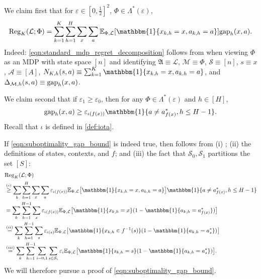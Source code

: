 \documentclass[11pt]{article}
\newcommand{\mf}[1]{\mathfrak{#1}}
\newcommand{\mcA}{\mathcal{A}}
\newcommand{\mcL}{\mathcal{L}}
\newcommand{\mcM}{\mathcal{M}}
\newcommand{\mcS}{\mathcal{S}}
\newcommand{\mbbE}{\mathbb{E}}
\newcommand{\reg}{\textnormal{Reg}}
\newcommand{\gap}{\textnormal{gap}}
\theoremstyle{definition}
\theoremstyle{definition}
\begin{document}
We claim first that
for $\varepsilon \in [0, \tfrac{1}{2}]^2$,
$\Phi \in \Lambda^*(\varepsilon)$,
\begin{equation}
	\reg_K(\mcL;\Phi)
	=
	\sum_{k = 1}^K
	\sum_{h = 1}^H
	\sum_x
	\sum_a
	\mbbE_{\Phi,\mcL}[\mathbbm{1}\{x_{k,h}=x,a_{k,h}=a\}]\gap_h(x,a)
	.
	\label{eqn:standard_mdp_regret_decomposition}
\end{equation}
Indeed: \eqref{eqn:standard_mdp_regret_decomposition} follows from \cite[Proposition 4]{tirinzoni2021fully} when viewing $\Phi$ as an \gls{MDP} with state space $[n]$ and identifying
$\mf{A} \equiv \mcL$,
$\mcM \equiv \Phi$,
$\mcS \equiv [n]$,
$s \equiv x$,
$\mcA \equiv [A]$,
$N_{K,h}(s,a) \equiv \sum_{k=1}^K\mathbbm{1}\{x_{k,h}=x,a_{k,h}=a\}$,
and
$\Delta_{\mcM,h}(s,a)\equiv \gap_h(x,a)$.

We claim second that
if $\varepsilon_1 \geq \varepsilon_0$,
then
for any $\Phi \in \Lambda^*(\varepsilon)$ and $h\in[H]$,
\begin{equation}
	\gap_h(x,a)
	\geq
	\varepsilon_{\iota(f(x))} \mathbbm{1}\{a\neq a^*_{f(x)}, h\leq H-1\}
	.
	\label{eqn:suboptimality_gap_bound}
\end{equation}
Recall that $\iota$ is defined in \eqref{def:iota}.

If \eqref{eqn:suboptimality_gap_bound} is indeed true, then  follows from
(i) ;
(ii) the definitions of states, contexts, and $f$;
and
(iii) the fact that $\mathcal{S}_0, \mathcal{S}_1$ partitions the set $[S]$:
\begin{equation}
	\begin{split}
		 &
		\reg_K(\mcL;\Phi)
		\\
		 &
		\overset{(i)}{\geq}
		\sum_k
		\sum_{h=1}^H
		\sum_x
		\sum_a
		\varepsilon_{\iota(f(x))}
		\mbbE_{\Phi,\mcL}
		\bigl[
		\mathbbm{1}\{x_{k,h}=x,a_{k,h}=a\}
		\bigr]
		\mathbbm{1}\{a\neq a^*_{f(x)}, h\leq H-1\}
		\\
		 &
		=
		\sum_k
		\sum_{h=1}^{H-1}
		\sum_x
		\varepsilon_{\iota(f(x))}
		\mbbE_{\Phi,\mcL}
		\bigl[
			\mathbbm{1}\{x_{k,h}=x\}
			(
			1-\mathbbm{1}\{a_{k,h} = a_{f(x)}^*\}
			)
			\bigr]
		\\
		 &
		\overset{(ii)}{=}
		\sum_k
		\sum_{h=1}^{H-1}
		\sum_{s}
		\varepsilon_{\iota(s)}
		\mbbE_{\Phi,\mcL}
		\bigl[
			\mathbbm{1}\{x_{k,h}\in f^{-1}(s)\}(1-\mathbbm{1}\{a_{k,h} = a_{s}^*\})
			\bigr]
		\\
		 &
		\overset{(iii)}{=}
		\sum_k
		\sum_{h=1}^{H-1}
		\sum_{i=0,1}
		\sum_{s\in\mcS_i}
		\varepsilon_i
		\mbbE_{\Phi,\mcL}
		\bigl[
			\mathbbm{1}\{s_{k,h}=s\}(1-\mathbbm{1}\{a_{k,h} = a_s^*\})
			\bigr]
		.
	\end{split}
\end{equation}
We will therefore pursue a proof of \eqref{eqn:suboptimality_gap_bound}.
\end{document}
